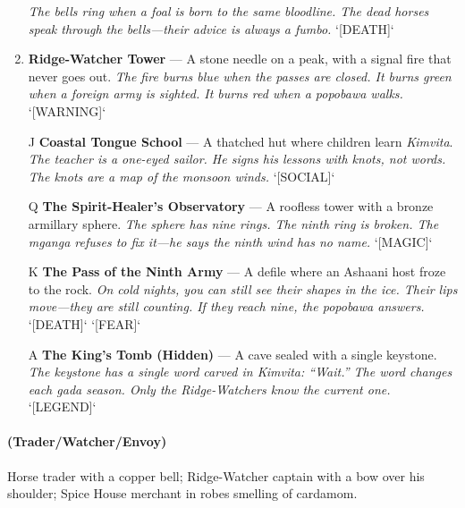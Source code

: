 \begin{enumerate}
  \hfill \textit{The bells ring when a foal is born to the same bloodline. The dead horses speak through the bells---their advice is always a \textit{fumbo}.} `[DEATH]`
\item \textbf{Ridge-Watcher Tower} --- A stone needle on a peak, with a signal fire that never goes out.
  \hfill \textit{The fire burns blue when the passes are closed. It burns green when a foreign army is sighted. It burns red when a \textit{popobawa} walks.} `[WARNING]`
\item[J] \textbf{Coastal Tongue School} --- A thatched hut where children learn \textit{Kimvita}.
  \hfill \textit{The teacher is a one-eyed sailor. He signs his lessons with knots, not words. The knots are a map of the monsoon winds.} `[SOCIAL]`
\item[Q] \textbf{The Spirit-Healer's Observatory} --- A roofless tower with a bronze armillary sphere.
  \hfill \textit{The sphere has nine rings. The ninth ring is broken. The \textit{mganga} refuses to fix it---he says the ninth wind has no name.} `[MAGIC]`
\item[K] \textbf{The Pass of the Ninth Army} --- A defile where an Ashaani host froze to the rock.
  \hfill \textit{On cold nights, you can still see their shapes in the ice. Their lips move---they are still counting. If they reach nine, the \textit{popobawa} answers.} `[DEATH]` `[FEAR]`
\item[A] \textbf{The King's Tomb (Hidden)} --- A cave sealed with a single keystone.
  \hfill \textit{The keystone has a single word carved in \textit{Kimvita}: ``Wait.'' The word changes each \textit{gada} season. Only the Ridge-Watchers know the current one.} `[LEGEND]`
\end{enumerate}

\paragraph*{(Trader/Watcher/Envoy)} Horse trader with a copper bell; Ridge-Watcher captain with a bow over his shoulder; Spice House merchant in robes smelling of cardamom.

